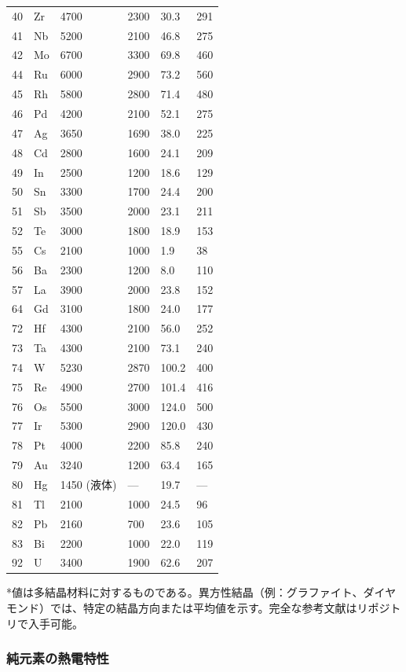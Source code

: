 \documentclass[11pt,a4paper]{article}
\theoremstyle{remark}
\begin{document}
\begin{longtable}{p{0.8cm}p{1.2cm}p{2.2cm}p{2.2cm}p{2.2cm}p{2.2cm}}
		40 & Zr & 4700 & 2300 & 30.3 & 291 \\
		41 & Nb & 5200 & 2100 & 46.8 & 275 \\
		42 & Mo & 6700 & 3300 & 69.8 & 460 \\
		44 & Ru & 6000 & 2900 & 73.2 & 560 \\
		45 & Rh & 5800 & 2800 & 71.4 & 480 \\
		46 & Pd & 4200 & 2100 & 52.1 & 275 \\
		47 & Ag & 3650 & 1690 & 38.0 & 225 \\
		48 & Cd & 2800 & 1600 & 24.1 & 209 \\
		49 & In & 2500 & 1200 & 18.6 & 129 \\
		50 & Sn & 3300 & 1700 & 24.4 & 200 \\
		51 & Sb & 3500 & 2000 & 23.1 & 211 \\
		52 & Te & 3000 & 1800 & 18.9 & 153 \\
		55 & Cs & 2100 & 1000 & 1.9 & 38 \\
		56 & Ba & 2300 & 1200 & 8.0 & 110 \\
		57 & La & 3900 & 2000 & 23.8 & 152 \\
		64 & Gd & 3100 & 1800 & 24.0 & 177 \\
		72 & Hf & 4300 & 2100 & 56.0 & 252 \\
		73 & Ta & 4300 & 2100 & 73.1 & 240 \\
		74 & W  & 5230 & 2870 & 100.2 & 400 \\
		75 & Re & 4900 & 2700 & 101.4 & 416 \\
		76 & Os & 5500 & 3000 & 124.0 & 500 \\
		77 & Ir & 5300 & 2900 & 120.0 & 430 \\
		78 & Pt & 4000 & 2200 & 85.8 & 240 \\
		79 & Au & 3240 & 1200 & 63.4 & 165 \\
		80 & Hg & 1450 (液体) & --- & 19.7 & --- \\
		81 & Tl & 2100 & 1000 & 24.5 & 96 \\
		82 & Pb & 2160 & 700 & 23.6 & 105 \\
		83 & Bi & 2200 & 1000 & 22.0 & 119 \\
		92 & U  & 3400 & 1900 & 62.6 & 207 \\
		\bottomrule
	\end{longtable}
	*値は多結晶材料に対するものである。異方性結晶（例：グラファイト、ダイヤモンド）では、特定の結晶方向または平均値を示す。完全な参考文献はリポジトリで入手可能。
	
	\subsubsection{純元素の熱電特性}
	\label{subsec:thermoelectric-properties-func}
	
\end{document}
